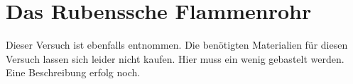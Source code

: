 \section{Das Rubenssche Flammenrohr}

Dieser Versuch ist ebenfalls \cite{Physikanten} entnommen.
Die benötigten Materialien für diesen Versuch lassen sich leider nicht kaufen.
Hier muss ein wenig gebastelt werden.
Eine Beschreibung erfolg noch.
